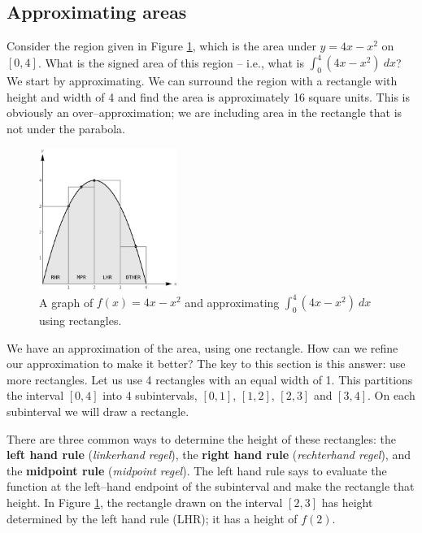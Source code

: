 
\subsection{Approximating areas}\label{subsec:Approximating_areas}

Consider the region given in Figure \ref{fig_int_4}, which is the area under $y=4x-x^2$ on $[0,4]$. What is the signed area of this region -- i.e., what is $\int_0^4(4x-x^2)\ dx$? We start by approximating. We can surround the region with a rectangle with height and width of 4 and find the area is approximately 16 square units. This is obviously an over--approximation; we are including area in the rectangle that is not under the parabola. 

\begin{figure}[h]
	\begin{center}
			\includegraphics[width=0.4\textwidth]{fig_int_4}
	\caption{A graph of $f(x) = 4x-x^2$ and approximating $\int_0^4(4x-x^2)\ dx$ using rectangles.}
	\label{fig_int_4}
	\end{center}
\end{figure}

We have an approximation of the area, using one rectangle. How can we refine our approximation to make it better? The key to this section is this answer: use more rectangles. Let us use 4 rectangles with an equal width of 1. This partitions the interval $[0,4]$ into 4 subintervals, $[0,1]$, $[1,2]$, $[2,3]$ and $[3,4]$. On each subinterval we will draw a rectangle.

There are three common ways to determine the height of these rectangles: the \textbf{left hand rule} (\textit{linkerhand regel}), the \textbf{right hand rule} (\textit{rechterhand regel}), and the \textbf{midpoint rule} (\textit{midpoint regel}). The left hand rule says to evaluate the function at the left--hand endpoint of the subinterval and make the rectangle that height. In Figure \ref{fig_int_4}, the rectangle drawn on the interval $[2,3]$ has height determined by the left hand rule (LHR); it has a height of $f(2)$. 

